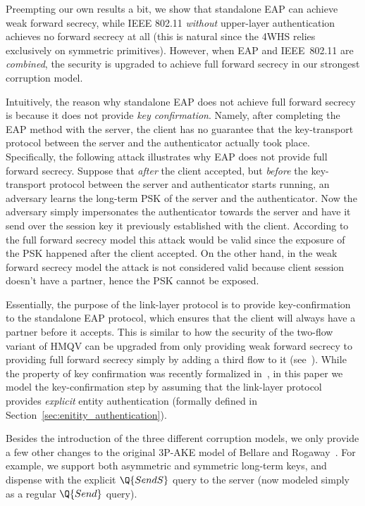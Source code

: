 Preempting our own results a bit,
we show that standalone EAP can achieve weak forward secrecy,
while IEEE 802.11 \emph{without} upper-layer authentication achieves no forward secrecy at all
(this is natural since the 4WHS relies exclusively on symmetric primitives).
However,
when EAP and IEEE~802.11 are \emph{combined},
the security is upgraded to achieve full forward secrecy in our strongest corruption model.
	

Intuitively,
the reason why standalone EAP does not achieve full forward secrecy is because it does not provide \emph{key confirmation}.
Namely,
after completing the EAP method with the server,
the client has no guarantee that the key-transport protocol between the server and the authenticator actually took place.
Specifically,
the following attack illustrates why EAP does not provide full forward secrecy. 
Suppose that \emph{after} the client accepted,
but \emph{before} the key-transport protocol between the server and authenticator starts running,
an adversary learns the long-term PSK of the server and the authenticator.
Now the adversary simply impersonates the authenticator towards the server and have it send over the session key it previously established with the client. 
According to the full forward secrecy model this attack would be valid since the exposure of the PSK happened after the client accepted.
On the other hand,
in the weak forward secrecy model the attack is not considered valid because client session doesn't have a partner,
hence the PSK cannot be exposed.

Essentially,
the purpose of the link-layer protocol is to provide key-confirmation to the standalone EAP protocol,
which ensures that the client will always have a partner before it accepts.
This is similar to how the security of the two-flow variant of HMQV can be upgraded from only providing weak forward secrecy to providing full forward secrecy simply by adding a third flow to it (see~\cite[§3]{C:Krawczyk05}).
While the property of key confirmation was recently formalized in~\cite{SP:FGSW16},
in this paper we model the key-confirmation step by assuming that the link-layer protocol provides \emph{explicit} entity authentication 
(formally defined in Section~\ref{sec:enitity_authentication}).
 


Besides the introduction of the three different corruption models,
we only provide a few other changes to the original 3P-AKE model of Bellare and Rogaway~\cite{STOC:BelRog95}. 
For example, 
we support both asymmetric and symmetric long-term keys,
and dispense with the explicit $\Q{SendS}$ query to the server 
(now modeled simply as a regular $\Q{Send}$ query). 


